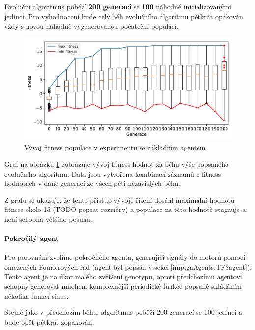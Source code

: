 Evoluční algoritmus poběží \textbf{200 generací} se \textbf{100} náhodně
inicializovanými jedinci. Pro vyhodnocení bude celý běh evolučního algoritmu
pětkrát opakován vždy s novou náhodně vygenerovanou počáteční populací.

\begin{figure}[!h]
    \centering
    \includegraphics[width=1\textwidth]{../img/experiment1_Sine_10ticks.pdf}
    \caption{Vývoj fitness populace v experimentu se základním agentem}
    \label{exp:first_sinefull}
\end{figure}

Graf na obrázku \ref{exp:first_sinefull} zobrazuje vývoj fitness
hodnot za běhu výše popsaného evolučního algoritmu. Data jsou vytvořena
kombinací záznamů o fitness hodnotách v dané generaci ze všech pěti nezávislých
běhů.

Z grafu se ukazuje, že tento přístup vývoje řízení dosáhl maximální hodnotu
fitness okolo 15 (TODO popsat rozměry) a populace na této hodnotě stagnuje a
není schopna většího posunu.

\paragraph{Pokročilý agent}
Pro porovnání zvolíme pokročilého agenta, generující signály do motorů pomocí
omezených Fourierových řad (agent byl popsán v sekci
\ref{imp:gaAgents.TFSagent}). Tento agent je na úkor malého zvětšení genotypu,
oproti předchozímu agentovi schopný generovat mnohem komplexnější periodické
funkce popsané skládáním několika funkcí sinus.

Stejně jako v předchozím běhu, algoritmus poběží 200 generací se 100 jedinci a
bude opět pětkrát zopakován.

